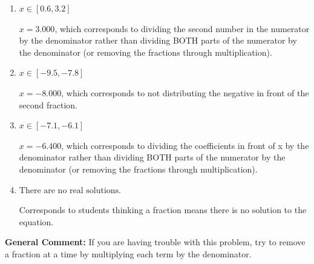 \documentclass{extbook}[14pt]
\begin{document}
\begin{enumerate}
{\begin{enumerate}[label=\Alph*.]
* $x = -4.800$, which is the correct option.
\item \( x \in [0.6, 3.2] \)

 $x = 3.000$, which corresponds to dividing the second number in the numerator by the denominator rather than dividing BOTH parts of the numerator by the denominator (or removing the fractions through multiplication).
\item \( x \in [-9.5, -7.8] \)

 $x = -8.000$, which corresponds to not distributing the negative in front of the second fraction.
\item \( x \in [-7.1, -6.1] \)

 $x = -6.400$, which corresponds to dividing the coefficients in front of x by the denominator rather than dividing BOTH parts of the numerator by the denominator (or removing the fractions through multiplication).
\item \( \text{There are no real solutions.} \)

Corresponds to students thinking a fraction means there is no solution to the equation.
\end{enumerate}

\textbf{General Comment:} If you are having trouble with this problem, try to remove a fraction at a time by multiplying each term by the denominator.
}
\end{enumerate}
\end{document}
